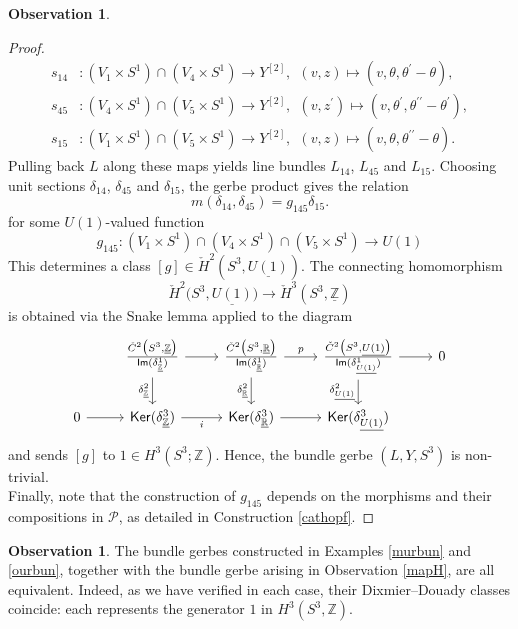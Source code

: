 \documentclass{article}
\theoremstyle{plain}
\theoremstyle{definition}
\newtheorem{obs}[thm]{Observation}
\begin{document}
\begin{obs}
\begin{proof}
\begin{align*}
s_{14}&:(V_1 \times S^1) \cap (V_4 \times S^1) \longrightarrow Y^{[2]}, ~~ (v,z) \longmapsto (v,\theta,\theta^\prime-\theta), \\
s_{45}&:(V_4 \times S^1) \cap (V_5 \times S^1) \longrightarrow Y^{[2]}, ~~ (v,z^\prime) \longmapsto (v,\theta^\prime,\theta^{\prime\prime}-\theta^\prime), \\
s_{15}&:(V_1 \times S^1) \cap (V_5 \times S^1) \longrightarrow Y^{[2]}, ~~ (v,z) \longmapsto (v,\theta,\theta^{\prime\prime}-\theta).
\end{align*}
Pulling back $L$ along these maps yields line bundles $L_{14}$, $L_{45}$ and $L_{15}$. Choosing unit sections $\delta_{14}$, $\delta_{45}$ and $\delta_{15}$, the gerbe product gives the relation
\[
m(\delta_{14},\delta_{45}) = g_{145} \delta_{15}.
\]
for some $U(1)$-valued function
\[
g_{145}:(V_1 \times S^1) \cap (V_4 \times S^1) \cap (V_5 \times S^1) \longrightarrow U(1)
\]
This determines a class $[g] \in \check{H}^2\left(S^3,\underline{U(1)}\right)$. The connecting homomorphism 
$$\check{H}^2\bigl(S^3,\underline{U(1)}\bigr) \longrightarrow \check{H}^3(S^3,\underline{\mathbb{Z}})$$
is obtained via the Snake lemma applied to the diagram
\[
\begin{tikzcd}
& \frac{\check{C}^2\bigl(S^3,\underline{\mathbb{Z}}\bigr)}{\mathsf{Im}(\delta^1_{\underline{\mathbb{Z}}})} \arrow[r] \arrow[d,"{\delta^2_{\underline{\mathbb{Z}}}}"'] & \frac{\check{C}^2\bigl(S^3,\underline{\mathbb{R}}\bigr)}{\mathsf{Im}(\delta^1_{\underline{\mathbb{R}}})} \arrow[r,"p"] \arrow[d,"\delta^2_{\underline{\mathbb{R}}}"'] & \frac{\check{C}^2\bigl(S^3,\underline{U(1)}\bigr)}{\mathsf{Im}(\delta^1_{\underline{U(1)}})} \arrow[r] \arrow[d,"\delta^2_{\underline{U(1)}}"'] & 0 \\
0 \arrow[r] & \mathsf{Ker}(\delta^3_{\underline{\mathbb{Z}}}) \arrow[r,"i"'] & \mathsf{Ker}(\delta^3_{\underline{\mathbb{R}}}) \arrow[r] & \mathsf{Ker}(\delta^3_{\underline{U(1)}}) &
\end{tikzcd}
\]
and sends $[g]$ to $1 \in H^3(S^3;\mathbb{Z})$. Hence, the bundle gerbe $(L,Y,S^3)$ is non-trivial.
\\
Finally, note that the construction of $g_{145}$ depends on the morphisms and their compositions in $\mathcal{P}$, as detailed in Construction \ref{cathopf}.
\end{proof}
\end{obs}
\begin{obs}
The bundle gerbes constructed in Examples \ref{murbun} and \ref{ourbun}, together with the bundle gerbe arising in Observation \ref{mapH}, are all equivalent. Indeed, as we have verified in each case, their Dixmier–Douady classes coincide: each represents the generator $1$ in $H^3(S^3,\mathbb{Z})$.
\end{obs}
\end{document}
